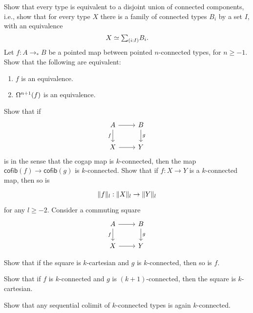 \begin{exercises}
  \exercise Show that every type is equivalent to a disjoint union of connected components, i.e., show that for every type $X$ there is a family of connected types $B_i$ by a set $I$, with an equivalence
  \begin{equation*}
    X \eqvsym \sm{i:I}B_i.
  \end{equation*}
\exercise Let $f:A\to_\ast B$ be a pointed map between pointed $n$-connected types, for $n\geq -1$. Show that the following are equivalent:
\begin{enumerate}
\item $f$ is an equivalence.
\item $\loopspace[n+1]{f}$ is an equivalence. 
\end{enumerate}
\exercise Show that if
\begin{equation*}
\begin{tikzcd}
A \arrow[r] \arrow[d,swap,"f"] & B \arrow[d,"g"] \\
X \arrow[r] & Y
\end{tikzcd}
\end{equation*}
is  in the sense that the cogap map is $k$-connected, then the map $\mathsf{cofib}(f)\to \mathsf{cofib}(g)$ is $k$-connected.
\exercise Show that if $f:X\to Y$ is a $k$-connected map, then so is
\begin{equation*}
  \begin{tikzcd}
    \trunc{l}{f}:\trunc{l}{X}\to\trunc{l}{Y}
  \end{tikzcd}
\end{equation*}
for any $l\geq-2$.
\exercise Consider a commuting square
\begin{equation*}
\begin{tikzcd}
A \arrow[d,swap,"f"] \arrow[r] & B \arrow[d,"g"] \\
X \arrow[r] & Y
\end{tikzcd}
\end{equation*}
\begin{subexenum}
\item Show that if the square is $k$-cartesian and $g$ is $k$-connected, then so is $f$.
\item Show that if $f$ is $k$-connected and $g$ is $(k+1)$-connected, then the square is $k$-cartesian. 
\end{subexenum}
\exercise
\begin{subexenum}
\item Show that any sequential colimit of $k$-connected types is again $k$-connected.

\end{subexenum}
\end{exercises}
